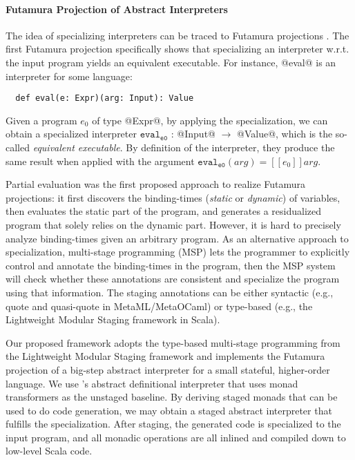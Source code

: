 \paragraph{Futamura Projection of Abstract Interpreters}

The idea of specializing interpreters can be traced to Futamura
projections \cite{Futamura1999, futamura1971partial}.  The first
Futamura projection specifically shows that specializing an
interpreter w.r.t. the input program yields an equivalent
executable. For instance, @eval@ is an interpreter for some language:
\begin{lstlisting}
  def eval(e: Expr)(arg: Input): Value
\end{lstlisting}
Given a program $e_0$ of type @Expr@, by applying the specialization,
we can obtain a specialized interpreter $\texttt{eval}_{\texttt{e0}}$
: @Input@ $\to$ @Value@, which is the so-called \textit{equivalent
  executable}.  By definition of the interpreter, they produce the
same result when applied with the argument
$\texttt{eval}_{\texttt{e0}}(arg) = [\![ e_0 ]\!] arg $.

Partial evaluation \cite{DBLP:books/daglib/0072559} was the first
proposed approach to realize Futamura projections: it first discovers
the binding-times (\textit{static} or \textit{dynamic}) of variables,
then evaluates the static part of the program, and generates a
residualized program that solely relies on the dynamic part. However,
it is hard to precisely analyze binding-times given an arbitrary
program.  As an alternative approach to specialization, multi-stage
programming (MSP) \cite{taha1999multi, DBLP:conf/pepm/TahaS97} lets
the programmer to explicitly control and annotate the binding-times in
the program, then the MSP system will check whether these annotations
are consistent and specialize the program using that information.  The
staging annotations can be either syntactic (e.g., quote and
quasi-quote in MetaML/MetaOCaml) or type-based (e.g., the Lightweight
Modular Staging framework \cite{DBLP:conf/gpce/RompfO10} in Scala).

Our proposed framework adopts the type-based multi-stage programming
from the Lightweight Modular Staging framework and implements the
Futamura projection of a big-step abstract interpreter for a small
stateful, higher-order language.  We use
\citet{DBLP:journals/pacmpl/DaraisLNH17}'s abstract definitional
interpreter that uses monad transformers as the unstaged baseline. By
deriving staged monads that can be used to do code generation, we may
obtain a staged abstract interpreter that fulfills the specialization.
After staging, the generated code is specialized to the input program,
and all monadic operations are all inlined and compiled down to
low-level Scala code.

